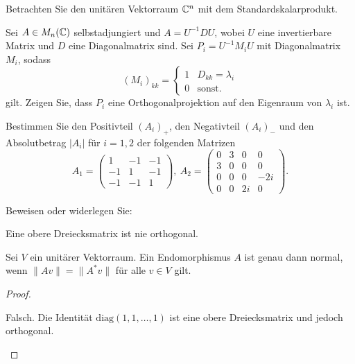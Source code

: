 \begin{Problem}
	Betrachten Sie den unitären Vektorraum $\mathbb{C}^n$ mit dem Standardskalarprodukt.
	\begin{parts}
		\item Sei $A\in M_n(\mathbb{C})$ selbstadjungiert und $A=U^{-1}DU$, wobei $U$ eine invertierbare Matrix und $D$ eine Diagonalmatrix sind. Sei $P_i=U^{-1}M_iU$ mit Diagonalmatrix $M_i$, sodass
		\[
			(M_i)_{kk}=\begin{cases}
				1 & D_{kk}=\lambda_i\\
				0 & \text{sonst.}
			\end{cases}
		\]
		gilt. Zeigen Sie, dass $P_i$ eine Orthogonalprojektion auf den Eigenraum von $\lambda_i$ ist.
		\item Bestimmen Sie den Positivteil $(A_i)_+$, den Negativteil $(A_i)_{-}$ und den Absolutbetrag $|A_i|$ f\"{u}r $i=1,2$ der folgenden Matrizen
			\[
				A_1=\begin{pmatrix} 1 & -1 & -1 \\ -1 & 1 & -1 \\ -1 & -1 & 1 \end{pmatrix},~A_2=\begin{pmatrix} 0 & 3 & 0 & 0 \\ 3 & 0 & 0 & 0 \\ 0 & 0 & 0 & -2i \\ 0 & 0 & 2i & 0 \end{pmatrix} 
			.\] 
	\end{parts}
\end{Problem}

\begin{Problem}
	Beweisen oder widerlegen Sie:
	\begin{parts}
	\item Eine obere Dreiecksmatrix ist nie orthogonal.
	\item Sei $V$ ein unitärer Vektorraum. Ein Endomorphismus $A$ ist genau dann normal, wenn $\|Av\|=\|A^*v\|$ f\"{u}r alle $v\in V$ gilt.  
	\end{parts}
\end{Problem}

\begin{proof}
	\begin{parts}
	\item Falsch. Die Identität $\text{diag}(1,1,\dots, 1)$ ist eine obere Dreiecksmatrix und jedoch orthogonal.
	\end{parts}
\end{proof}

